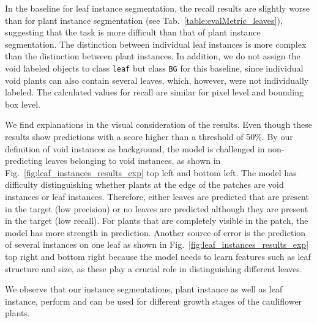 \documentclass{article}
\def\figref#1{Fig.~\ref{#1}}
\def\tabref#1{Tab.~\ref{#1}}
\begin{document}
In the baseline for leaf instance segmentation, the recall results are slightly worse than for plant instance segmentation (see \tabref{table:evalMetric_leaves}), suggesting that the task is more difficult than that of plant instance segmentation.
The distinction between individual leaf instances is more complex than the distinction between plant instances. In addition, we do not assign the void labeled objects to class \texttt{leaf} but class \texttt{BG} for this baseline, since individual void plants can also contain several leaves, which, however, were not individually labeled. The calculated values for recall are similar for pixel level and bounding box level. 

We find explanations in the visual consideration of the results. Even though these results show predictions with a score higher than a threshold of 50\%. By our definition of void instances as background, the model is challenged in non-predicting leaves belonging to void instances, as shown in \figref{fig:leaf_instances_results_exp} top left and bottom left.
The model has difficulty distinguishing whether plants at the edge of the patches are void instances or leaf instances. Therefore, either leaves are predicted that are present in the target (low precision) or no leaves are predicted although they are present in the target (low recall). 
For plants that are completely visible in the patch, the model has more strength in prediction.
Another source of error is the prediction of several instances on one leaf as shown in \figref{fig:leaf_instances_results_exp} top right and bottom right because the model needs to learn features such as leaf structure and size, as these play a crucial role in distinguishing different leaves.

We observe that our instance segmentations, plant instance as well as leaf instance, perform and can be used for different growth stages of the cauliflower plants.
\end{document}
